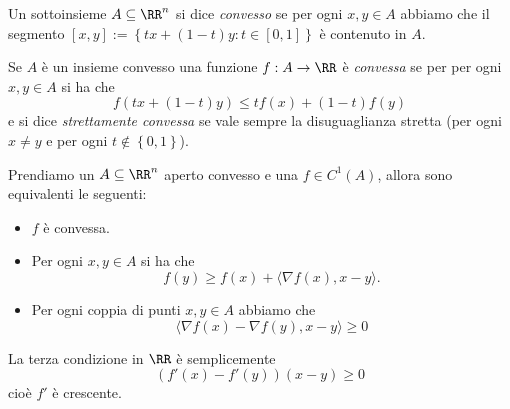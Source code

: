 \documentclass[11pt]{scrartcl}
\begin{document}
	\begin{definition}
		Un sottoinsieme $A\subseteq\RR^n$ si dice \textit{convesso} se per ogni $x,y\in A$ abbiamo che il segmento $[x,y]:=\left\{tx+(1-t)y:t\in [0,1]\right\}$
		è contenuto in $A$.
	\end{definition}
	\begin{definition}
		Se $A$ è un insieme convesso una funzione $f:A\to\RR$ è \textit{convessa} se per per ogni $x,y\in A$ si ha che
		$$f\left(tx+(1-t)y\right)\le tf(x)+(1-t)f(y)$$
		e si dice \textit{strettamente convessa} se vale sempre la disuguaglianza stretta (per ogni $x\ne y$ e per ogni $t\not\in \left\{0,1\right\}$).
	\end{definition}
	\begin{theorem}
		Prendiamo un $A\subseteq\RR^n$ aperto convesso e una $f\in C^1(A)$, allora sono equivalenti le seguenti:
		\begin{itemize}
			\item[(a)] $f$ è convessa.
			\item[(b)] Per ogni $x,y\in A$ si ha che
			$$f(y)\ge f(x)+\langle \nabla f(x),x-y\rangle.$$
			\item[(c)] Per ogni coppia di punti $x,y\in A$ abbiamo che
			$$\langle \nabla f (x)-\nabla f(y),x-y\rangle \ge 0$$
		\end{itemize}
	\end{theorem}
	\begin{remark}
		La terza condizione in $\RR$ è semplicemente
		$$\left(f'(x)-f'(y)\right)(x-y)\ge 0$$
		cioè $f'$ è crescente.
	\end{remark}
\end{document}
